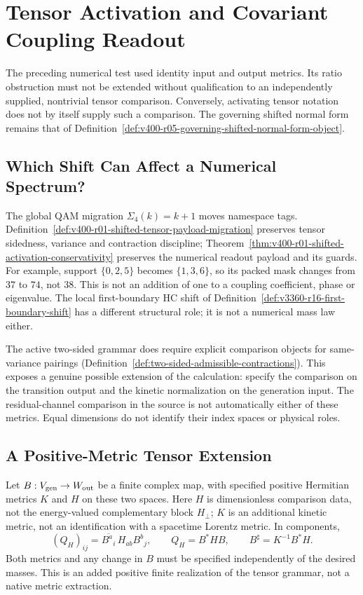 \section{Tensor Activation and Covariant Coupling Readout}
\label{v480:tensor-shift-coupling}

The preceding numerical test used identity input and output metrics.
Its ratio obstruction must not be extended without qualification to
an independently supplied, nontrivial tensor comparison. Conversely,
activating tensor notation does not by itself supply such a comparison.
The governing shifted normal form remains that of
Definition~\ref{def:v400-r05-governing-shifted-normal-form-object}.

\subsection{Which Shift Can Affect a Numerical Spectrum?}

The global QAM migration $\Sigma_4(k)=k+1$ moves namespace tags.
Definition~\ref{def:v400-r01-shifted-tensor-payload-migration}
preserves tensor sidedness, variance and contraction discipline;
Theorem~\ref{thm:v400-r01-shifted-activation-conservativity}
preserves the numerical readout payload and its guards. For example,
support $\{0,2,5\}$ becomes $\{1,3,6\}$, so its packed mask
changes from $37$ to $74$, not $38$. This is not an addition of one
to a coupling coefficient, phase or eigenvalue. The local first-boundary
HC shift of Definition~\ref{def:v3360-r16-first-boundary-shift}
has a different structural role; it is not a numerical mass law either.

The active two-sided grammar does require explicit comparison objects
for same-variance pairings
(Definition~\ref{def:two-sided-admissible-contractions}).
This exposes a genuine possible extension of the calculation: specify
the comparison on the transition output and the kinetic normalization
on the generation input. The residual-channel comparison in the source
is not automatically either of these metrics. Equal dimensions do not
identify their index spaces or physical roles.

\subsection{A Positive-Metric Tensor Extension}

Let $B:V_{\rm gen}\to W_{\rm out}$ be a finite complex map, with
specified positive Hermitian metrics $K$ and $H$ on these two spaces.
Here $H$ is dimensionless comparison data, not the energy-valued
complementary block $H_\perp$; $K$ is an additional kinetic metric,
not an identification with a spacetime Lorentz metric. In components,
\[
 (Q_H)_{ij}=\overline{B^a{}_i}\,H_{ab}B^b{}_j,\qquad
 Q_H=B^*HB,\qquad B^\sharp=K^{-1}B^*H.
\]
Both metrics and any change in $B$ must be specified independently of
the desired masses. This is an added positive finite realization of
the tensor grammar, not a native metric extraction.

